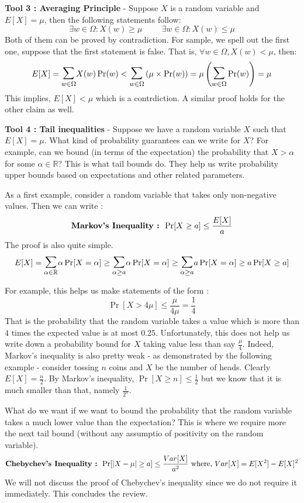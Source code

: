 \begin{description}
\item{\bf Tool 3 : Averaging Principle } - 
Suppose $X$ is a random variable and $E[X] = \mu$, then the following statements follow:
$$\exists w \in \Omega : X(w) \ge \mu \hspace{1cm} \exists w \in \Omega : X(w) \le \mu$$
Both of them can be proved by contradiction. For sample, we spell out the first one, suppose that the first statement is false. That is, $\forall w \in \Omega, X(w) < \mu$, then:
$$E[X] = \bigsum_{w \in \Omega} X(w) \Pr(w) < \bigsum_{w \in \Omega} \left( \mu \times  \Pr(w) \right) = \mu \left( \bigsum_{w \in \Omega} \Pr(w) \right) = \mu$$
This implies, $E[X] < \mu$ which is a contrdiction. A similar proof holds for the other claim as well.
\item{\bf Tool 4 : Tail inequalities} - Suppose we have a random variable $X$ such that $E[X] = \mu$. What kind of probability guarantees can we write for $X$? For example, can we bound (in terms of the expectation) the probability that $X > \alpha$ for some $\alpha \in \mathbb{R}$? This is what tail bounds do. They help us write probability upper bounds based on expectations and other related parameters. 

As a first example, consider a random variable that takes only non-negative values. Then we can write :
$$\textrm{\bf Markov's Inequality : } \Pr[X \ge a] \le \frac{E[X]}{a}$$
The proof is also quite simple.
$$
E[X] = \bigsum_{\alpha \in \mathbb{R}} \alpha \Pr[X=\alpha] 
\ge \bigsum_{\alpha \ge a} \alpha \Pr[X=\alpha] \ge 
\bigsum_{\alpha \ge a} a \Pr[X=\alpha] \ge 
a \Pr[X \ge a]$$

For example, this helps us make statements of the form :
$$\Pr[X > 4\mu] \le \frac{\mu}{4\mu} = \frac{1}{4}$$
That is the probability that the random variable takes a value which is more than $4$ times the expected value is at most $0.25$. Unfortunately, this does not help us write down a probability bound for $X$ taking value less than say $\frac{\mu}{4}$. Indeed, Markov's inequality is also pretty weak - as demonstrated by the following example - consider tossing $n$ coins and $X$ be the number of heads. Clearly $E[X] = \frac{n}{2}$. By Markov's inequality, $\Pr[X \ge n] \le \frac{1}{2}$ but we know that it is much smaller than that, namely $\frac{1}{2^n}$.

What do we want if we want to bound the probability that the random variable takes a much lower value than the expectation? This is where we require more the next tail bound (without any assumptio of positivity on the random variable).
$$\textrm{\bf Chebychev's Inequality : } \Pr[|X-\mu| \ge a] \le \frac{Var[X]}{a^2} \textrm{ where, $Var[X] = E[X^2] - E[X]^2$} $$
We will not discuss the proof of Chebychev's inequality since we do not require it immediately. This concludes the review.
\end{description}

